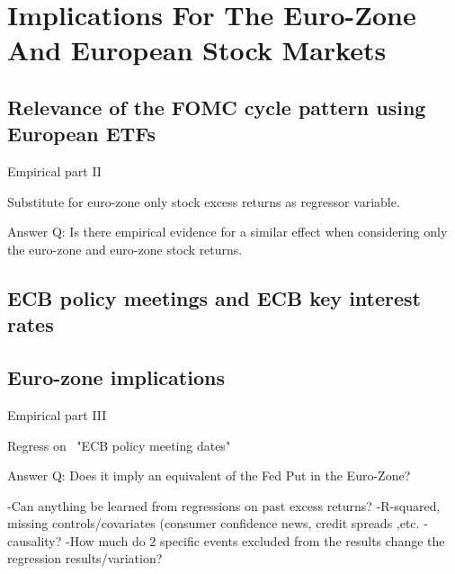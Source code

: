 

\chapter{Implications For The Euro-Zone And European Stock Markets}

\newpage

\section{Relevance of the FOMC cycle pattern using European ETFs}

Empirical part II

Substitute for euro-zone only stock excess returns as regressor variable.


Answer Q: Is there empirical evidence for a similar effect when considering only the euro-zone and euro-zone stock returns. 


\newpage


\section{ECB policy meetings and ECB key interest rates}

\newpage

\section{Euro-zone implications}

Empirical part III

Regress on ~"ECB policy meeting dates"

Answer Q: Does it imply an equivalent of the Fed Put in the Euro-Zone?


-Can anything be learned from regressions on past excess returns?
-R-squared,  missing controls/covariates (consumer confidence news, credit spreads ,etc.
-causality?
-How much do 2 specific events excluded from the results change the regression results/variation?


\newpage